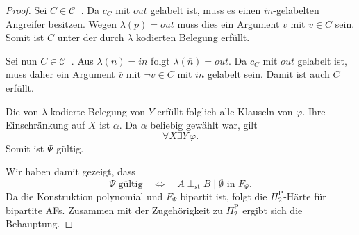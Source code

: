 \begin{proof}
Sei \(C\in\mathcal C^+\). Da \(c_C\) mit \(\mathit{out}\) gelabelt ist,
muss es einen \(\mathit{in}\)-gelabelten Angreifer besitzen. Wegen
\(\lambda(p)=\mathit{out}\) muss dies ein Argument \(v\) mit \(v\in C\)
sein. Somit ist \(C\) unter der durch \(\lambda\) kodierten Belegung
erfüllt.

Sei nun \(C\in\mathcal C^-\). Aus
\(\lambda(n)=\mathit{in}\) folgt
\(\lambda(\overline n)=\mathit{out}\). Da \(c_C\) mit
\(\mathit{out}\) gelabelt ist, muss daher ein Argument
\(\overline v\) mit \(\neg v\in C\) mit \(\mathit{in}\) gelabelt sein.
Damit ist auch \(C\) erfüllt.

Die von \(\lambda\) kodierte Belegung von \(Y\) erfüllt folglich alle
Klauseln von \(\varphi\). Ihre Einschränkung auf \(X\) ist
\(\alpha\). Da \(\alpha\) beliebig gewählt war, gilt
\[
    \forall X\exists Y\,\varphi.
\]
Somit ist \(\Psi\) gültig.

Wir haben damit gezeigt, dass
\[
    \Psi\text{ gültig}
    \quad\Longleftrightarrow\quad
    A\perp_{\mathrm{st}}B\mid\emptyset
    \text{ in }F_\Psi.
\]
Da die Konstruktion polynomial und \(F_\Psi\) bipartit ist, folgt die
\(\Pi_2^{\mathrm P}\)-Härte für bipartite AFs. Zusammen mit der
Zugehörigkeit zu \(\Pi_2^{\mathrm P}\) ergibt sich die Behauptung.
\end{proof}